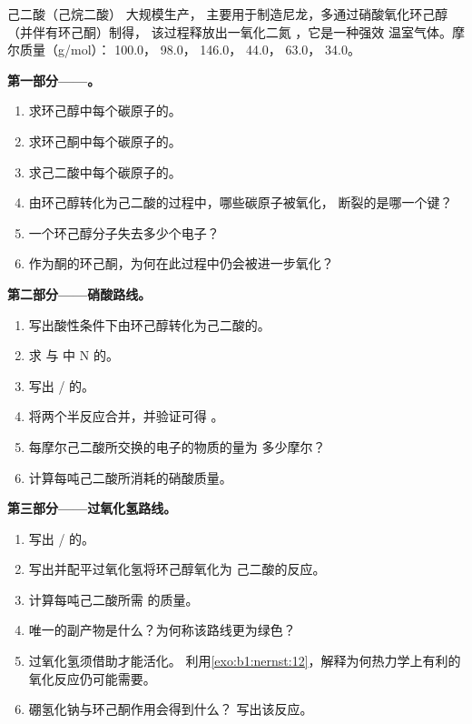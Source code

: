 \begin{problem}
\label{pb:b1:organic-redox:1}
己二酸（己烷二酸） 大规模生产，
主要用于制造尼龙，多通过硝酸氧化环己醇（并伴有环己酮）制得，
该过程释放出一氧化二氮 ，它是一种强效
温室气体。摩尔质量（\unit{g/mol}）： 100.0，
 98.0， 146.0， 44.0， 63.0，
 34.0。

\medskip
\noindent\textbf{第一部分——。}
\begin{enumerate}
  \item 求环己醇中每个碳原子的。
  \item 求环己酮中每个碳原子的。
  \item 求己二酸中每个碳原子的。
  \item 由环己醇转化为己二酸的过程中，哪些碳原子被氧化，
        断裂的是哪一个键？
  \item 一个环己醇分子失去多少个电子？
  \item 作为酮的环己酮，为何在此过程中仍会被进一步氧化？
\end{enumerate}

\medskip
\noindent\textbf{第二部分——硝酸路线。}
\begin{enumerate}[resume]
  \item 写出酸性条件下由环己醇转化为己二酸的。
  \item 求  与  中 N 的。
  \item 写出 / 的。
  \item 将两个半反应合并，并验证可得
        。
  \item 每摩尔己二酸所交换的电子的物质的量为
        多少摩尔？
  \item 计算每吨己二酸所消耗的硝酸质量。
\end{enumerate}

\medskip
\noindent\textbf{第三部分——过氧化氢路线。}
\begin{enumerate}[resume]
  \item 写出 / 的。
  \item 写出并配平过氧化氢将环己醇氧化为
        己二酸的反应。
  \item 计算每吨己二酸所需  的质量。
  \item 唯一的副产物是什么？为何称该路线更为绿色？
  \item 过氧化氢须借助才能活化。
        利用\cref{exo:b1:nernst:12}，解释为何热力学上有利的
        氧化反应仍可能需要。
  \item 硼氢化钠与环己酮作用会得到什么？
        写出该反应。
\end{enumerate}


\end{problem}
